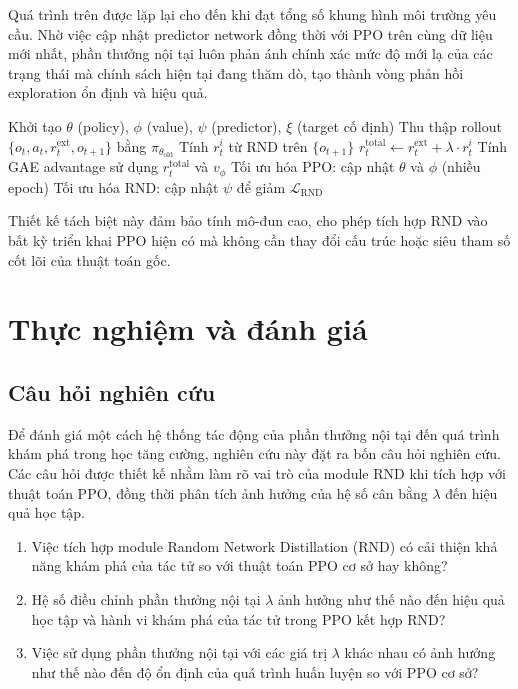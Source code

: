 \documentclass{uetgraduation}
\begin{document}
Quá trình trên được lặp lại cho đến khi đạt tổng số khung hình môi trường yêu cầu. Nhờ việc cập nhật predictor network đồng thời với PPO trên cùng dữ liệu mới nhất, phần thưởng nội tại luôn phản ánh chính xác mức độ mới lạ của các trạng thái mà chính sách hiện tại đang thăm dò, tạo thành vòng phản hồi exploration ổn định và hiệu quả.

\begin{algorithm}[H]
\caption{Quy trình huấn luyện PPO + RND}
\begin{algorithmic}[1]
\State Khởi tạo $\theta$ (policy), $\phi$ (value), $\psi$ (predictor), $\xi$ (target cố định)
    \State Thu thập rollout $\{o_t, a_t, r_t^{\text{ext}}, o_{t+1}\}$ bằng $\pi_{\theta_{\text{old}}}$
    \State Tính $r_t^i$ từ RND trên $\{o_{t+1}\}$
    \State $r_t^{\text{total}} \leftarrow r_t^{\text{ext}} + \lambda \cdot r_t^i$
    \State Tính GAE advantage sử dụng $r_t^{\text{total}}$ và $v_\phi$
    \State Tối ưu hóa PPO: cập nhật $\theta$ và $\phi$ (nhiều epoch)
    \State Tối ưu hóa RND: cập nhật $\psi$ để giảm $\mathcal{L}_{\text{RND}}$ 
\EndFor
\end{algorithmic}
\end{algorithm}

Thiết kế tách biệt này đảm bảo tính mô-đun cao, cho phép tích hợp RND vào bất kỳ triển khai PPO hiện có mà không cần thay đổi cấu trúc hoặc siêu tham số cốt lõi của thuật toán gốc.

\chapter{Thực nghiệm và đánh giá}

\section{Câu hỏi nghiên cứu}

Để đánh giá một cách hệ thống tác động của phần thưởng nội tại đến quá trình khám phá trong học tăng cường, nghiên cứu này đặt ra bốn câu hỏi nghiên cứu. Các câu hỏi được thiết kế nhằm làm rõ vai trò của module RND khi tích hợp với thuật toán PPO, đồng thời phân tích ảnh hưởng của hệ số cân bằng $\lambda$ đến hiệu quả học tập.

\begin{enumerate}
    \item[\textbf{RQ1:}] Việc tích hợp module Random Network Distillation (RND) có cải thiện khả năng khám phá của tác tử so với thuật toán PPO cơ sở hay không?

    \item[\textbf{RQ2:}] Hệ số điều chỉnh phần thưởng nội tại $\lambda$ ảnh hưởng như thế nào đến hiệu quả học tập và hành vi khám phá của tác tử trong PPO kết hợp RND?

    \item[\textbf{RQ3:}] Việc sử dụng phần thưởng nội tại với các giá trị $\lambda$ khác nhau có ảnh hưởng như thế nào đến độ ổn định của quá trình huấn luyện so với PPO cơ sở?
\end{enumerate}
\end{document}
